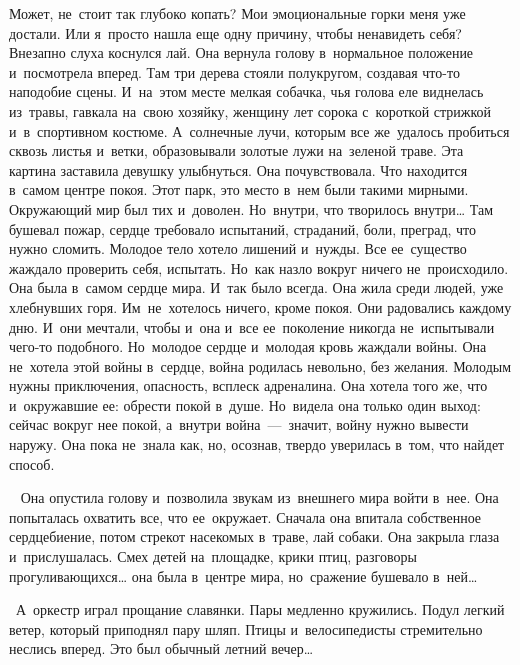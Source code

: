 Может, не~стоит так глубоко копать? Мои эмоциональные горки меня уже достали.
Или я~просто нашла еще одну причину, чтобы ненавидеть себя? 
~
Внезапно слуха коснулся лай.
Она вернула голову в~нормальное положение и~посмотрела вперед.
Там три дерева стояли полукругом, создавая что-то наподобие сцены.
И~на~этом месте мелкая собачка, чья голова еле виднелась из~травы, гавкала на~свою хозяйку, женщину лет сорока с~короткой стрижкой и~в~спортивном костюме.
А~солнечные лучи, которым все же~удалось пробиться сквозь листья и~ветки, образовывали золотые лужи на~зеленой траве.
Эта картина заставила девушку улыбнуться.
Она почувствовала.
Что находится в~самом центре покоя.
Этот парк, это место в~нем были такими мирными.
Окружающий мир был тих и~доволен.
Но~внутри, что творилось внутри… Там бушевал пожар, сердце требовало испытаний, страданий, боли, преград, что нужно сломить.
Молодое тело хотело лишений и~нужды.
Все ее~существо жаждало проверить себя, испытать.
Но~как назло вокруг ничего не~происходило.
Она была в~самом сердце мира.
И~так было всегда.
Она жила среди людей, уже хлебнувших горя.
Им~не~хотелось ничего, кроме покоя.
Они радовались каждому дню.
И~они мечтали, чтобы и~она и~все ее~поколение никогда не~испытывали чего-то подобного.
Но~молодое сердце и~молодая кровь жаждали войны.
Она не~хотела этой войны в~сердце, война родилась невольно, без желания.
Молодым нужны приключения, опасность, всплеск адреналина.
Она хотела того же, что и~окружавшие ее: обрести покой в~душе.
Но~видела она только один выход: сейчас вокруг нее покой, а~внутри война~---~значит, войну нужно вывести наружу.
Она пока не~знала как, но, осознав, твердо уверилась в~том, что найдет способ.

~
Она опустила голову и~позволила звукам из~внешнего мира войти в~нее.
Она попыталась охватить все, что ее~окружает.
Сначала она впитала собственное сердцебиение, потом стрекот насекомых в~траве, лай собаки.
Она закрыла глаза и~прислушалась.
Смех детей на~площадке, крики птиц, разговоры прогуливающихся… она была в~центре мира, но~сражение бушевало в~ней…
 
~А~оркестр играл прощание славянки.
Пары медленно кружились.
Подул легкий ветер, который приподнял пару шляп.
Птицы и~велосипедисты стремительно неслись вперед.
Это был обычный летний вечер… 
